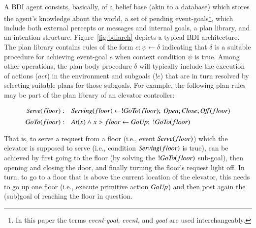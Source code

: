 
A BDI agent consists, basically, of a belief base (akin to a database) which
stores the agent's knowledge about the world, a set of pending
event-goals\footnote{In this paper the terms {\em event-goal}, {\em event}, and
{\em goal} are used interchangeably.}, which include both external percepts or
messages and internal goals, a plan library, and an intention structure.
Figure~\ref{fig:bdiarch} depicts a typical BDI architecture.
The plan library contains rules of the form $e: \psi \leftarrow \delta$
indicating that $\delta$ is a suitable procedure for achieving event-goal $e$
when context condition $\psi$ is true.
Among other operations, the plan body procedure $\delta$ will typically include
the execution of actions ($act$) in the environment and subgoals ($!e$) that are
in turn resolved by selecting suitable plans for those subgoals.
For example, the following plan rules may be part of the plan library of an
elevator controller:

\[
\begin{array}{rl}\small
\mbox{\textit{Serve}}(floor)  : &  \mbox{\textit{Serving}}(floor) \leftarrow 
	!\mbox{\textit{GoTo}}(floor);\ \mbox{\textit{Open}}; \mbox{\textit{Close}}; \mbox{\textit{Off}}(floor) \\[1ex] 
\mbox{\textit{GoTo}}(floor)  : & \mbox{\textit{At}}(x) \land x>floor \leftarrow \mbox{\textit{GoUp}};\ !\mbox{\textit{GoTo}}(floor)
\end{array}
\]

That is, to serve a request from a floor (i.e., event $\mbox{\textit{Serve}}(floor)$)
which the elevator is supposed to serve (i.e., condition $\mbox{\textit{Serving}}(floor)$ is
true), can be achieved by first going to the floor (by solving the
$!\mbox{\textit{GoTo}}(floor)$ sub-goal), then opening and closing the door, and finally
turning the floor's request light off.
In turn, to go to a floor that is above the current location of the elevator,
this needs to go up one floor (i.e., execute primitive action $\mbox{\textit{GoUp}}$) and then
post again the (sub)goal of reaching the floor in question.





